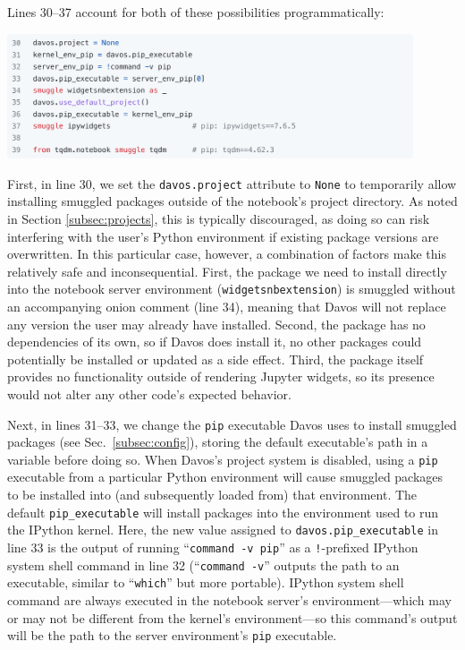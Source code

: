 \documentclass[preprint,12pt,a4paper]{elsarticle}
\begin{document}
Lines 30--37 account for both of these possibilities programmatically:
\begin{center}
\includegraphics[width=0.9\textwidth]{figs/example7}
\end{center}
First, in line 30, we set the \texttt{davos.project} attribute to \texttt{None} to temporarily 
allow installing smuggled packages outside of the notebook's project directory. 
As noted in Section \ref{subsec:projects}, this is typically discouraged, as doing so can risk interfering with the user's Python environment if existing package versions are overwritten.
In this particular case, however, a combination of factors make this relatively safe and inconsequential.
First, the package we need to install directly into the notebook server environment (\texttt{widgetsnbextension}) is smuggled without an accompanying onion comment (line 34), meaning that Davos will not replace any version the user may already have installed.
Second, the package has no dependencies of its own, so if Davos does install it, no other packages could potentially be installed or updated as a side effect.
Third, the package itself provides no functionality outside of rendering Jupyter widgets, so its presence would not alter any other code's expected behavior.

Next, in lines 31--33, we change the \texttt{pip} executable Davos uses to install smuggled packages (see Sec.~\ref{subsec:config}), storing the default executable's path in a variable before doing so. 
When Davos's project system is disabled, using a \texttt{pip} executable from a particular Python environment will cause smuggled packages to be installed into (and subsequently loaded from) that environment. 
The default \texttt{pip\_executable} will install packages into the environment used to run the IPython kernel. 
Here, the new value assigned to \texttt{davos.pip\_executable} in line 33 is the output of running ``\texttt{command -v pip}'' as a \mbox{\texttt{!}-prefixed} IPython system shell command in line 32 (``\texttt{command -v}'' outputs the path to an executable, similar to ``\texttt{which}'' but more portable). 
IPython system shell command are always executed in the notebook server's environment---which may or may not be different from the kernel's environment---so this command's output will be the path to the server environment's \texttt{pip} executable.
\end{document}
